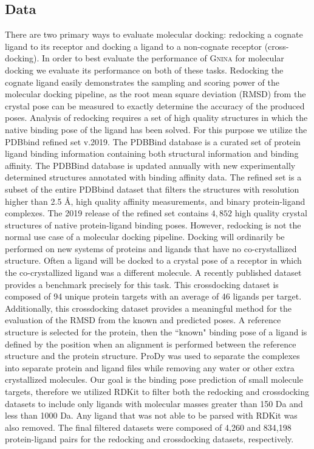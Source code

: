 \documentclass[journal=jcisd8,manuscript=article]{achemso}
\begin{document}
\subsection{Data}
There are two primary ways to evaluate molecular docking: redocking a cognate ligand to its receptor and docking a ligand to a non-cognate receptor (cross-docking). In order to best evaluate the performance of \textsc{Gnina} for molecular docking we evaluate its performance on both of these tasks. Redocking the cognate ligand easily demonstrates the sampling and scoring power of the molecular docking pipeline, as the root mean square deviation (RMSD) from the crystal pose can be measured to exactly determine the accuracy of the produced poses. Analysis of redocking requires a set of high quality structures in which the native binding pose of the ligand has been solved. For this purpose we utilize the PDBbind refined set v.2019\cite{liu2017forging}. The PDBBind database is a curated set of protein ligand binding information containing both structural information and binding affinity. The PDBBind database is updated annually with new experimentally determined structures annotated with binding affinity data. The refined set is a subset of the entire PDBbind dataset that filters the structures with resolution higher than 2.5 \AA, high quality affinity measurements, and binary protein-ligand complexes. The 2019 release of the refined set contains $4,852$ high quality crystal structures of native protein-ligand binding poses. However, redocking is not the normal use case of a molecular docking pipeline. Docking will ordinarily be performed on new systems of proteins and ligands that have no co-crystallized structure. Often a ligand will be docked to a crystal pose of a receptor in which the co-crystallized ligand was a different molecule. A recently published dataset provides a benchmark precisely for this task\cite{wierbowski2020cross}. This crossdocking dataset is composed of 94 unique protein targets with an average of 46 ligands per target. Additionally, this crossdocking dataset provides a meaningful method for the evaluation of the RMSD from the known and predicted poses. A reference structure is selected for the protein, then the ``known" binding pose of a ligand is defined by the position when an alignment is performed between the reference structure and the protein structure. ProDy\cite{bakan2011prody} was used to separate the complexes into separate protein and ligand files while removing any water or other extra crystallized molecules. Our goal is the binding pose prediction of small molecule targets, therefore we utilized RDKit\cite{rdkit} to filter both the redocking and crossdocking datasets to include only ligands with molecular masses greater than 150 Da and less than 1000 Da. Any ligand that was not able to be parsed with RDKit was also removed. The final filtered datasets were composed of 4,260 and 834,198 protein-ligand pairs for the redocking and crossdocking datasets, respectively.
\end{document}
